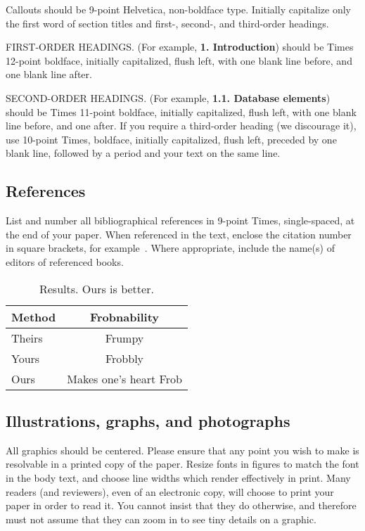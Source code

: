 \documentclass[10pt,twocolumn,letterpaper]{article}
\begin{document}
\noindent Callouts should be 9-point Helvetica, non-boldface type. Initially
capitalize only the first word of section titles and first-, second-, and
third-order headings.

FIRST-ORDER HEADINGS. (For example, {\large \bf 1. Introduction}) should be
Times 12-point boldface, initially capitalized, flush left, with one blank line
before, and one blank line after.

SECOND-ORDER HEADINGS. (For example, { \bf 1.1. Database elements}) should be
Times 11-point boldface, initially capitalized, flush left, with one blank line
before, and one after. If you require a third-order heading (we discourage it),
use 10-point Times, boldface, initially capitalized, flush left, preceded by one
blank line, followed by a period and your text on the same line.


\subsection{References}

List and number all bibliographical references in 9-point Times, single-spaced,
at the end of your paper. When referenced in the text, enclose the citation
number in square brackets, for example~\cite{Authors14}.  Where appropriate,
include the name(s) of editors of referenced books.

\begin{table}
\begin{center}
\begin{tabular}{|l|c|}
\hline
Method & Frobnability \\
\hline\hline
Theirs & Frumpy \\
Yours & Frobbly \\
Ours & Makes one's heart Frob\\
\hline
\end{tabular}
\end{center}
\caption{Results.   Ours is better.}
\end{table}

\subsection{Illustrations, graphs, and photographs}

All graphics should be centered.  Please ensure that any point you wish to make
is resolvable in a printed copy of the paper.  Resize fonts in figures to match
the font in the body text, and choose line widths which render effectively in
print.  Many readers (and reviewers), even of an electronic copy, will choose to
print your paper in order to read it.  You cannot insist that they do otherwise,
and therefore must not assume that they can zoom in to see tiny details on a
graphic.
\end{document}
